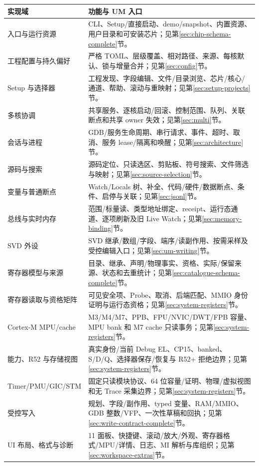 \documentclass[UTF8,a4paper,11pt,oneside,fontset=none]{ctexart}
\begin{document}
{\small
\begin{longtable}{@{}P{37mm}P{124mm}@{}}\toprule
实现域 & 功能与 UM 入口\\\midrule\endhead
入口与运行资源 & CLI、Setup/直接启动、demo/snapshot、内置资源、用户目录和可安装芯片；见第\ref{sec:chip-schema-complete}节。\\
工程配置与持久偏好 & 严格 TOML、层级覆盖、相对路径、来源、每核默认、锁与增量合并；见第\ref{sec:config}节。\\
Setup 与选择器 & 工程发现、字段编辑、文件/目录浏览、芯片/核心/通道、帮助、滚动与重映射；见第\ref{sec:setup-projects}节。\\
多核协调 & 共享服务、逐核启动/回滚、控制范围、队列、关联断点和共享 owner 失效；见第\ref{sec:multi}节。\\
会话与进程 & GDB/服务生命周期、串行请求、事件、超时、取消、服务 lease/隔离和唤醒；见第\ref{sec:architecture}节。\\
源码与搜索 & 源码定位、只读选区、剪贴板、符号搜索、文件筛选与映射；见第\ref{sec:source-selection}节。\\
变量与普通断点 & Watch/Locals 树、补全、代码/硬件/数据断点、条件、启停与关联；见第\ref{sec:jsonl}节。\\
总线与实时内存 & 范围/标量读、类型地址绑定、receipt、运行态通道、逐项刷新及旧 Live Watch；见第\ref{sec:memory-binding}节。\\
SVD 外设 & SVD 继承/数组/字段、端序/读副作用、按需采样及受控编辑入口；见第\ref{sec:um-writing}节。\\
寄存器模型与来源 & 目录、继承、声明/物理事实、资格、实际/保留来源、状态和去重统计；见第\ref{sec:catalogue-schema-complete}节。\\
寄存器读取与资格矩阵 & 可见安全项、Probe、取消、后端匹配、MMIO 身份证明与运行态资格；见第\ref{sec:system-registers}节。\\
Cortex-M MPU/cache & M3/M4/M7、PPB、FPU/NVIC/DWT/FPB 容量、MPU bank 和 M7 cache 只读事务；见第\ref{sec:system-registers}节。\\
能力、R52 与存储视图 & 真实身份/当前 Debug EL、CP15、banked、S/D/Q、选择器保存/恢复与 R52+ 拒绝边界；见第\ref{sec:system-registers}节。\\
Timer/PMU/GIC/STM & 固定只读模块协议、64 位容量/证明、物理/虚拟视图和无 Trace 采集边界；见第\ref{sec:system-registers}节。\\
受控写入 & 规划、字段/副作用、typed 变量、RAM/MMIO、GDB 整数/VFP、一次性草稿和回执；见第\ref{sec:write-contract-complete}节。\\
UI 布局、格式与诊断 & 11 面板、快捷键、滚动/放大/外观、寄存器格式/MPU/详情、日志、MI 解析与库组织；见第\ref{sec:workspace-extras}节。\\
\bottomrule\end{longtable}}
\end{document}
